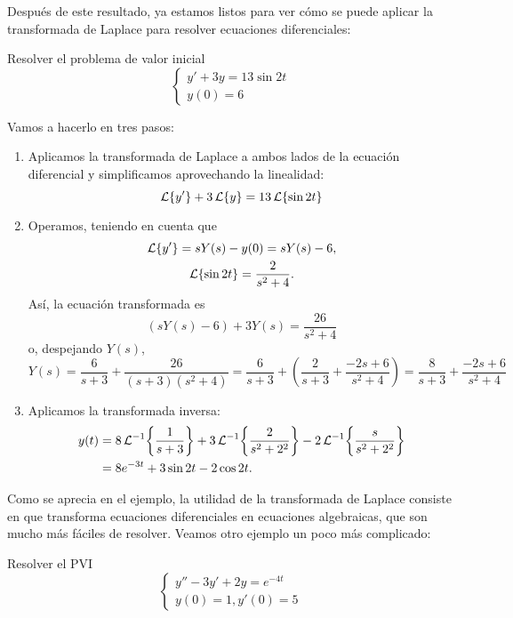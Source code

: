 \documentclass[../ecuaciones_diferenciales.tex]{subfiles}
\begin{document}
Después de este resultado, ya estamos listos para ver cómo se puede aplicar la
transformada de Laplace para resolver ecuaciones diferenciales:

\begin{example}
	Resolver el problema de valor inicial
	\[
		\begin{cases}
			y' + 3y = 13 \sin 2t \\
			y(0) = 6
		\end{cases}
	\]
\end{example}

\begin{solution}
	Vamos a hacerlo en tres pasos:
	\begin{enumerate}[1)]
		\item Aplicamos la transformada de Laplace a ambos lados de la ecuación
		      diferencial y simplificamos aprovechando la linealidad:
		      \[\operatorname{\mathcal{L}}\{y'\} + 3\operatorname{\mathcal{L}}\{y\} = 13\operatorname{\mathcal{L}}\{\sin 2t\}\]
		\item Operamos, teniendo en cuenta que
		      \begin{gather*}
			      \operatorname{\mathcal{L}}\{y'\} = sY(s) - y(0) = sY(s) -  6, \\
			      \operatorname{\mathcal{L}}\{\sin 2t\} = \frac{2}{s^2+4}.
		      \end{gather*}
		      Así, la ecuación transformada es
		      \[(sY(s) - 6) + 3Y(s) = \frac{26}{s^2+4}\]
		      o, despejando \(Y(s)\),
		      \[
			      Y(s) = \frac{6}{s+3} + \frac{26}{(s+3)(s^2+4)} = \frac{6}{s+3} + \left(
			      \frac{2}{s+3} + \frac{-2s+6}{s^2+4} \right) = \frac{8}{s+3} + \frac{-2s+6}{s^2+4}
		      \]
		\item Aplicamos la transformada inversa:
		      \begin{align*}
			      y(t) & = 8 \laplace^{-1}\left\{\frac{1}{s+3}\right\} + 3
			      \laplace^{-1}\left\{\frac{2}{s^2+2^2}\right\} -2
			      \laplace^{-1}\left\{\frac{s}{s^2+2^2}\right\}            \\
			           & = 8e^{-3t} + 3\sin 2t - 2\cos 2t.
		      \end{align*}
	\end{enumerate}
\end{solution}

Como se aprecia en el ejemplo, la utilidad de la transformada de Laplace consiste
en que transforma ecuaciones diferenciales en ecuaciones algebraicas, que son
mucho más fáciles de resolver. Veamos otro ejemplo un poco más complicado:

\begin{example}
	Resolver el PVI
	\[
		\begin{cases}
			y'' - 3y' + 2y = e^{-4t} \\
			y(0) = 1, y'(0) = 5
		\end{cases}
	\]
\end{example}
\end{document}
